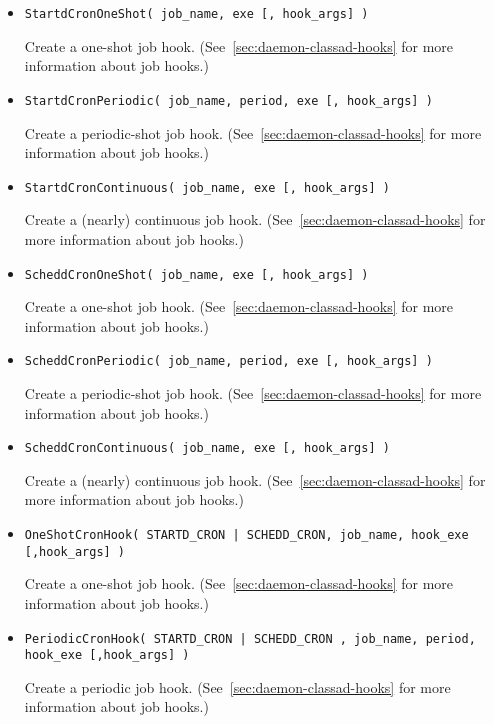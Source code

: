 \begin{description}
\begin{itemize}
    \item \texttt{StartdCronOneShot( job\_name, exe [, hook\_args] )}

	Create a one-shot  job hook.
	(See~\ref{sec:daemon-classad-hooks} for more information about job hooks.)

    \item \texttt{StartdCronPeriodic( job\_name, period, exe [, hook\_args] )}

	Create a periodic-shot  job hook.
	(See~\ref{sec:daemon-classad-hooks} for more information about job hooks.)

    \item \texttt{StartdCronContinuous( job\_name, exe [, hook\_args] )}

	Create a (nearly) continuous  job hook.
	(See~\ref{sec:daemon-classad-hooks} for more information about job hooks.)

    \item \texttt{ScheddCronOneShot( job\_name, exe [, hook\_args] )}

	Create a one-shot  job hook.
	(See~\ref{sec:daemon-classad-hooks} for more information about job hooks.)

    \item \texttt{ScheddCronPeriodic( job\_name, period, exe [, hook\_args] )}

	Create a periodic-shot  job hook.
	(See~\ref{sec:daemon-classad-hooks} for more information about job hooks.)

    \item \texttt{ScheddCronContinuous( job\_name, exe [, hook\_args] )}

	Create a (nearly) continuous  job hook.
	(See~\ref{sec:daemon-classad-hooks} for more information about job hooks.)

    \item \texttt{OneShotCronHook( STARTD\_CRON | SCHEDD\_CRON, job\_name,
	hook\_exe [,hook\_args] )}

	Create a one-shot job hook.
	(See~\ref{sec:daemon-classad-hooks} for more information about job hooks.)

    \item \texttt{PeriodicCronHook( STARTD\_CRON | SCHEDD\_CRON , job\_name,
	period, hook\_exe [,hook\_args] )}

	Create a periodic job hook.
	(See~\ref{sec:daemon-classad-hooks} for more information about job hooks.)


\end{itemize}
\end{description}
